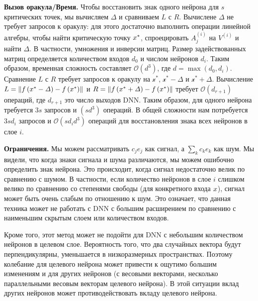 \textbf{Вызов оракула/Время.} Чтобы восстановить знак одного нейрона для $s$ критических точек, мы вычисляем $\mathit{\Delta}$ и сравниваем $L$ с $R$. Вычислене $\mathit{\Delta}$ не требует запросов к оракулу: для этого достаточно выполнить операции линейной алгебры, чтобы найти критическую точку $\mathnormal{x}^{*}$, спроецировать  ${A}_{j}^{\left(i\right)}$ на $V^{\left(i\right)}$ и найти $\mathit{\Delta}$. В частности, умножения и инверсии матриц. Размер задействованных матриц определяется количеством входов $d_{0}$ и числом нейронов $d_{i}$. Таким образом, временная сложность составляет $\mathcal{O}\left(d^{3}\right)$, где $d = \max(d_{0}, d_{i})$. Сравнение $L$ с $R$ требует запросов к оракулу на $\mathcal{x}^{*}$,  $\mathcal{x}^{*} - \mathit{\Delta}$ и $\mathcal{x}^{*} + \mathit{\Delta}$. Вычисление  $L =\left \| \mathnormal{f}\left(\mathnormal{x}^{*} - \mathit{\Delta}\right) - \mathnormal{f}\left(\mathnormal{x}^{*}\right) \right \|$ и $R = \left \| \mathnormal{f}\left(\mathnormal{x}^{*} + \mathit{\Delta}\right) - \mathnormal{f}\left(\mathnormal{x}^{*}\right) \right \|$ требует $\mathcal{O}(d_{r+1})$ операций, где $d_{r+1}$ это число выходов DNN. Таким образом, для одного нейрона требуется $3s$ запросов и $\left(s d^{3}\right)$ операций. В общей сложности нам потребуется $3sd_{i}$ запросов и $\mathcal{O}\left(sd_{i}d^{3}\right)$ операций для восстановления знака всех нейронов в слое $i$.

\textbf{Ограничения.} Мы можем рассматривать $c_{j} e_{j}$ как сигнал, а $\sum \nolimits_{k}{c_{k} e_{k}}$ как шум. Мы видели, что когда знаки сигнала и шума различаются, мы можем ошибочно определить знак нейрона. Это происходит, когда сигнал недостаточно велик по сравнению с шумом. В частности, если количество нейронов в слое $i$ слишком велико по сравнению со степенями свободы (для конкретного входа $\mathnormal{x}$), сигнал может быть очень слабым по отношению к шум. Это означает, что данная техника может не работать с DNN с большим расширением по сравнению с наименьшим скрытым слоем или количеством входов.

Кроме того, этот метод может не подойти для DNN с небольшим количеством нейронов в целевом слое. Вероятность того, что два случайных вектора будут перпендикулярны, уменьшается в низкоразмерных пространствах. Поэтому колебание для целевого нейрона может привести к ощутимо большим изменениям и для других нейронов (с весовыми векторами, несколько параллельными весовым векторам целевого нейрона). В этой ситуации вклад других нейронов может противодействовать вкладу целевого нейрона.

